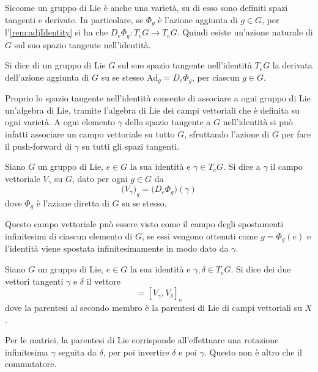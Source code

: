 Siccome un gruppo di Lie è anche una varietà, su di esso sono definiti spazi tangenti e derivate. In particolare, se $\Phi_g$ è l'azione aggiunta di $g \in G$, per l'\autoref{rem:adjIdentity} si ha che $D_e \Phi_g: T_e G \to T_e G$. Quindi esiste un'azione naturale di $G$ sul suo spazio tangente nell'identità.
\begin{definition}
  Si dice  di un gruppo di Lie $G$ sul suo spazio tangente nell'identità $T_e G$ la derivata dell'azione aggiunta di $G$ su se stesso $\mathrm{Ad}_g = D_e \Phi_g$, per ciascun $g \in G$. 
\end{definition}

Proprio lo spazio tangente nell'identità consente di associare a ogni gruppo di Lie un'algebra di Lie, tramite l'algebra di Lie dei campi vettoriali che è definita su ogni varietà. A ogni elemento $\gamma$ dello spazio tangente a $G$ nell'identità si può infatti associare un campo vettoriale su tutto $G$, sfruttando l'azione di $G$ per fare il push-forward di $\gamma$ su tutti gli spazi tangenti.
\begin{definition}
  Siano $G$ un gruppo di Lie, $e \in G$ la sua identità e $\gamma \in T_e G$. Si dice  a $\gamma$ il campo vettoriale $V_\gamma$ su $G$, dato per ogni $g \in G$ da \begin{equation*}
  \big(V_\gamma\big)_g = \big(D_e \Phi_g\big) (\gamma)
  \end{equation*} 
  dove $\Phi_g$ è l'azione diretta di $G$ su se stesso.
\end{definition}
\begin{remark}
  Questo campo vettoriale può essere visto come il campo degli spostamenti infinitesimi di ciascun elemento di $G$, se essi vengono ottenuti come $g=\Phi_g(e)$ e l'identità viene spostata infinitesimamente in modo dato da $\gamma$.
\end{remark}
\begin{definition}
  Siano $G$ un gruppo di Lie, $e \in G$ la sua identità e $\gamma, \delta \in T_e G$. Si dice  dei due vettori tangenti $\gamma$ e $\delta$ il vettore \begin{equation*}
  [\gamma,\delta] = [V_{\gamma}, V_{\delta}]_e
  \end{equation*} 
  dove la parentesi al secondo membro è la parentesi di Lie di campi vettoriali su $X$.
\end{definition}
\begin{remark}
  Per le matrici, la parentesi di Lie corrisponde all'effettuare una rotazione infinitesima $\gamma$ seguita da $\delta$, per poi invertire $\delta$ e poi $\gamma$. Questo non è altro che il commutatore.
\end{remark}
